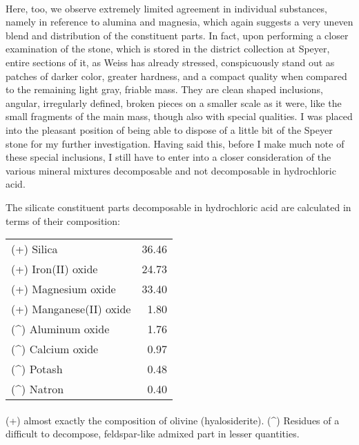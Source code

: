 \documentclass[a4paper, 12pt, oneside]{article}
\begin{document}
\paragraph{}
Here, too, we observe extremely limited agreement in individual substances, namely in reference to alumina and magnesia, which again suggests a very uneven blend and distribution of the constituent parts. In fact, upon performing a closer examination of the stone, which is stored in the district collection at Speyer, entire sections of it, as Weiss has already stressed, conspicuously stand out as patches of darker color, greater hardness, and a compact quality when compared to the remaining light gray, friable mass. They are clean shaped inclusions, angular, irregularly defined, broken pieces on a smaller scale as it were, like the small fragments of the main mass, though also with special qualities. I was placed into the pleasant position of being able to dispose of a little bit of the Speyer stone for my further investigation. Having said this, before I make much note of these special inclusions, I still have to enter into a closer consideration of the various mineral mixtures decomposable and not decomposable in hydrochloric acid.

The silicate constituent parts decomposable in hydrochloric acid are calculated in terms of their composition:
\begin{center}
    \begin{tabular}{l r}
        (+) Silica & 36.46\\
        (+) Iron(II) oxide & 24.73\\
        (+) Magnesium oxide & 33.40\\
        (+) Manganese(II) oxide & 1.80\\
        (\^{}) Aluminum oxide & 1.76\\
        (\^{}) Calcium oxide & 0.97\\
        (\^{}) Potash & 0.48\\
        (\^{}) Natron & 0.40\\
    \end{tabular}
\end{center}
\paragraph{}
(+) almost exactly the composition of olivine (hyalosiderite). (\^{}) Residues of a difficult to decompose, feldspar-like admixed part in lesser quantities.
\end{document}
